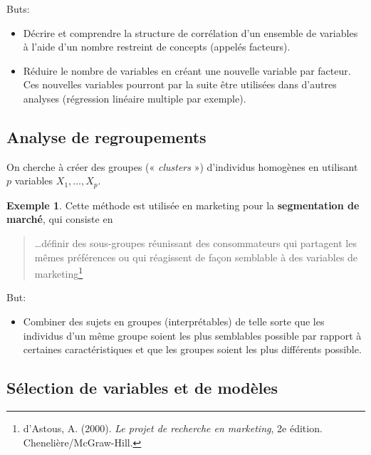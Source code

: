 \documentclass[
  11pt,
  letterpaper,
]{book}
\providecommand{\tightlist}{%
  \setlength{\itemsep}{0pt}\setlength{\parskip}{0pt}}
\theoremstyle{definition}
\theoremstyle{definition}
\newtheorem{example}{Exemple}[chapter]
\theoremstyle{definition}
\theoremstyle{definition}
\theoremstyle{remark}
\begin{document}
Buts:

\begin{itemize}
\tightlist
\item
  Décrire et comprendre la structure de corrélation d'un ensemble de variables à l'aide d'un nombre restreint de concepts (appelés facteurs).
\item
  Réduire le nombre de variables en créant une nouvelle variable par facteur. Ces nouvelles variables pourront par la suite être utilisées dans d'autres analyses (régression linéaire multiple par exemple).
\end{itemize}

\hypertarget{analyse-de-regroupements}{%
\subsection{Analyse de regroupements}\label{analyse-de-regroupements}}

On cherche à créer des groupes (« \emph{clusters} ») d'individus homogènes en utilisant \(p\) variables \(X_1, \ldots, X_p\).

\begin{example}
\protect\hypertarget{exm:unnamed-chunk-2}{}{\label{exm:unnamed-chunk-2} }
Cette méthode est utilisée en marketing pour la \textbf{segmentation de marché}, qui consiste en

\begin{quote}
\ldots définir des sous-groupes réunissant des consommateurs qui partagent les mêmes préférences ou qui réagissent de façon semblable à des variables de marketing\footnote{d'Astous, A. (2000). \emph{Le projet de recherche en marketing}, 2e édition. Chenelière/McGraw-Hill.}
\end{quote}
\end{example}

But:

\begin{itemize}
\tightlist
\item
  Combiner des sujets en groupes (interprétables) de telle sorte que les individus d'un même groupe soient les plus semblables possible par rapport à certaines caractéristiques et que les groupes soient les plus différents possible.
\end{itemize}

\hypertarget{suxe9lection-de-variables-et-de-moduxe8les}{%
\subsection{Sélection de variables et de modèles}\label{suxe9lection-de-variables-et-de-moduxe8les}}
\end{document}
